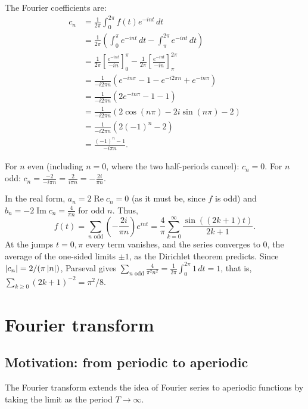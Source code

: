 \begin{notechapter}
\begin{example}
The Fourier coefficients are:
\begin{align*}
c_n &= \frac{1}{2\pi} \int_0^{2\pi} f(t) e^{-int} \, dt \\
&= \frac{1}{2\pi} \left( \int_0^{\pi} e^{-int} \, dt - \int_{\pi}^{2\pi} e^{-int} \, dt \right) \\
&= \frac{1}{2\pi} \left[ \frac{e^{-int}}{-in} \right]_0^{\pi} - \frac{1}{2\pi} \left[ \frac{e^{-int}}{-in} \right]_{\pi}^{2\pi} \\
&= \frac{1}{-i 2\pi n} \left( e^{-in\pi} - 1 - e^{-i 2\pi n} + e^{-in\pi} \right) \\
&= \frac{1}{-i 2\pi n} \left( 2e^{-in\pi} - 1 - 1 \right) \\
&= \frac{1}{-i 2\pi n} \left( 2\cos(n\pi) - 2i\sin(n\pi) - 2 \right) \\
&= \frac{1}{-i 2\pi n} \left( 2(-1)^n - 2 \right) \\
&= \frac{(-1)^n - 1}{-i\pi n}.
\end{align*}

For $n$ even (including $n=0$, where the two half-periods cancel): $c_n = 0$.
For $n$ odd: $c_n = \frac{-2}{-i\pi n} = \frac{2}{i\pi n} = -\frac{2i}{\pi n}$.

In the real form, $a_n = 2\operatorname{Re} c_n = 0$ (as it must be, since $f$ is odd) and $b_n = -2\operatorname{Im} c_n = \frac{4}{\pi n}$ for odd $n$. Thus,
\[
f(t) = \sum_{n \text{ odd}} \left(-\frac{2i}{\pi n}\right) e^{int} = \frac{4}{\pi} \sum_{k=0}^{\infty} \frac{\sin((2k+1)t)}{2k+1}.
\]
At the jumps $t = 0, \pi$ every term vanishes, and the series converges to $0$, the average of the one-sided limits $\pm 1$, as the Dirichlet theorem predicts. Since $\left|c_n\right| = 2/(\pi\left|n\right|)$, Parseval gives $\sum_{n \text{ odd}} \frac{4}{\pi^2 n^2} = \frac{1}{2\pi}\int_0^{2\pi} 1\,dt = 1$, that is, $\sum_{k\ge0} (2k+1)^{-2} = \pi^2/8$.
\end{example}

\section{Fourier transform}

\subsection{Motivation: from periodic to aperiodic}

The Fourier transform extends the idea of Fourier series to aperiodic functions by taking the limit as the period $T \to \infty$.


\end{notechapter}
